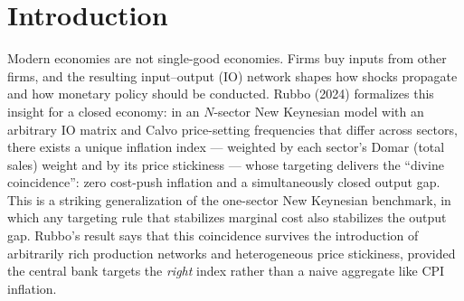 \documentclass[12pt]{article}
\begin{document}
\begin{abstract}
leaves the ranking intact and shows that Peg's loss is invariant to sectoral resolution while Float's
and Managed's fall by up to two-thirds, a granular-diversification effect of many small sectoral
shocks, so that Peg's relative penalty grows from about 3--4 times Float's to 7--10 times. I discuss the paper's
relation to the contemporaneous and independent Qiu, Wang, Xu and Zanetti (2026) result, and lay out
the concrete steps --- a cross-border multi-sector calibration, an estimated (rather than assumed)
risk-premium process, and an empirical validation exercise chief among them --- required before the
quantitative ranking can be treated as more than suggestive.
\end{abstract}

\tableofcontents
\newpage

\section{Introduction}

Modern economies are not single-good economies. Firms buy inputs from other firms, and the resulting
input--output (IO) network shapes how shocks propagate and how monetary policy should be conducted.
Rubbo (2024) formalizes this insight for a closed economy: in an $N$-sector New Keynesian model with
an arbitrary IO matrix and Calvo price-setting frequencies that differ across sectors, there exists a
unique inflation index --- weighted by each sector's Domar (total sales) weight and by its price
stickiness --- whose targeting delivers the ``divine coincidence'': zero cost-push inflation and a
simultaneously closed output gap. This is a striking generalization of the one-sector New Keynesian
benchmark, in which any targeting rule that stabilizes marginal cost also stabilizes the output gap.
Rubbo's result says that this coincidence survives the introduction of arbitrarily rich production
networks and heterogeneous price stickiness, provided the central bank targets the \emph{right}
index rather than a naive aggregate like CPI inflation.
\end{document}
